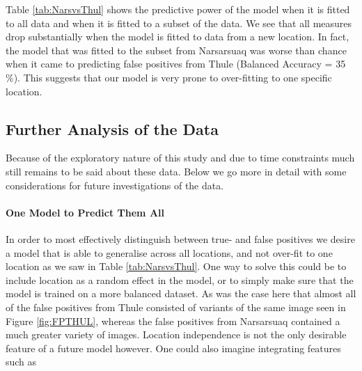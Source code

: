 \documentclass[12pt]{article}
\newcommand{\mytilde}{\raise.17ex\hbox{$\scriptstyle\mathtt{\sim}$}} %
\begin{document}
Table \ref{tab:NarsvsThul} shows the predictive power of the model when it is fitted to all data and when it is fitted to a subset of the data. We see that all measures drop substantially when the model is fitted to data from a new location. In fact, the model that was fitted to the subset from Narsarsuaq was worse than chance when it came to predicting false positives from Thule (Balanced Accuracy = 35 \%). This suggests that our model is very prone to over-fitting to one specific location.



\subsection{Further Analysis of the Data}
Because of the exploratory nature of this study and due to time constraints much still remains to be said about these data. Below we go more in detail with some considerations for future investigations of the data.

\paragraph{One Model to Predict Them All}
In order to most effectively distinguish between true- and false positives we desire a model that is able to generalise across all locations, and not over-fit to one location as we saw in Table \ref{tab:NarsvsThul}. One way to solve this could be to include location as a random effect in the model, or to simply make sure that the model is trained on a more balanced dataset. As was the case here that almost all of the false positives from Thule consisted of variants of the same image seen in Figure \ref{fig:FPTHUL}, whereas the false positives from Narsarsuaq contained a much greater variety of images.
Location independence is not the only desirable feature of a future model however. One could also imagine integrating features such as 
\end{document}
